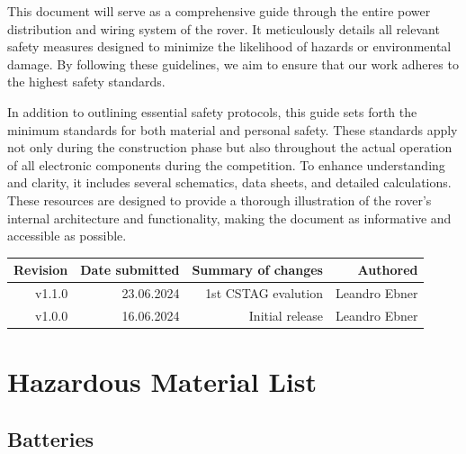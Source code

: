     This document will serve as a comprehensive guide through the entire power distribution and wiring system of the rover. It meticulously details all relevant safety measures designed to minimize the likelihood of hazards or environmental damage. By following these guidelines, we aim to ensure that our work adheres to the highest safety standards. 

    \vspace{5mm} %

    In addition to outlining essential safety protocols, this guide sets forth the minimum standards for both material and personal safety. These standards apply not only during the construction phase but also throughout the actual operation of all electronic components during the competition. To enhance understanding and clarity, it includes several schematics, data sheets, and detailed calculations. These resources are designed to provide a thorough illustration of the rover's internal architecture and functionality, making the document as informative and accessible as possible.

    \begin{table}[b!] %
        \centering
        \begin{tabular}{|r|r|r|r|} \hline %
             Revision& Date submitted& Summary of changes&  Authored      \\ \hline 
             v1.1.0&   23.06.2024&     1st CSTAG evalution& Leandro Ebner \\ \hline 
             v1.0.0&   16.06.2024&     Initial release&     Leandro Ebner \\ \hline
        \end{tabular}
    \end{table}

    \clearpage %
    
\section{Hazardous Material List}

    \subsection{Batteries}
    
